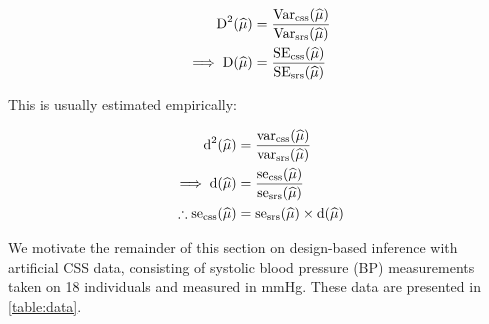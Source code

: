\begin{align}
\label{eq:true-design}
\text{D}^{2}(\widehat{\mu}) 		&=	\frac{\text{Var}_{\text{css}}(\widehat{\mu})}{\text{Var}_{\text{srs}}(\widehat{\mu})}			\\
\notag
\implies \text{D}(\widehat{\mu}) 		&=	\frac{\text{SE}_{\text{css}}(\widehat{\mu})}{\text{SE}_{\text{srs}}(\widehat{\mu})}
\end{align}

This is usually estimated empirically:

\begin{align}
\label{eq:empirical-design}
\text{d}^{2}(\widehat{\mu}) 				&= \frac{\text{var}_{\text{css}}(\widehat{\mu})}{\text{var}_{\text{srs}}(\widehat{\mu})}	\\
\notag
\implies \text{d}(\widehat{\mu}) 				&= \frac{\text{se}_{\text{css}}(\widehat{\mu})}{\text{se}_{\text{srs}}(\widehat{\mu})}	\\
\notag
\therefore \text{se}_{\text{css}}(\widehat{\mu}) 	&= \text{se}_{\text{srs}}(\widehat{\mu}) \times \text{d}(\widehat{\mu}) 		
\end{align}

We motivate the remainder of this section on design-based inference with artificial CSS data, consisting of systolic blood pressure (BP) measurements taken on 18 individuals and measured in mmHg. These data are presented in \autoref{table:data}.

